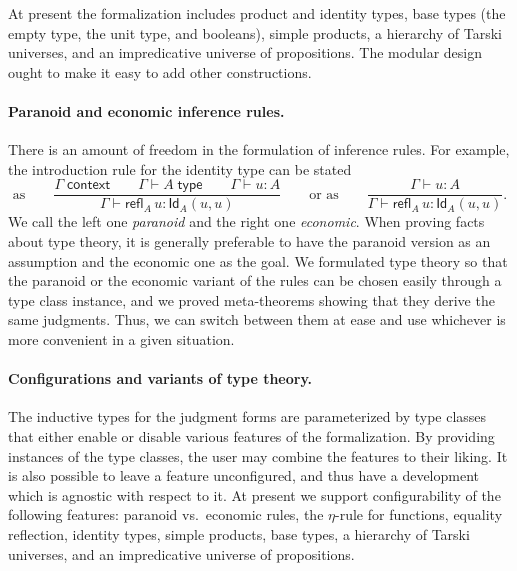 \documentclass{easychair}
\newcommand{\Id}[3]{\mathsf{Id}_{#1}(#2,#3)}
\newcommand{\refl}[2]{\mathsf{refl}_{#1}\,#2}
\newcommand{\ctx}{\Gamma}
\newcommand{\isctx}{\ctx\;\mathsf{context}}
\newcommand{\istype}[1]{\ctx \vdash #1 \;\mathsf{type}}
\newcommand{\isterm}[2]{\ctx \vdash #1 : #2}
\begin{document}
At present the formalization includes product and identity types, base types (the empty
type, the unit type, and booleans), simple products, a hierarchy of Tarski universes, and
an impredicative universe of propositions. The modular design ought to make it easy to add
other constructions.


\paragraph*{Paranoid and economic inference rules.}


There is an amount of freedom in the formulation of inference rules. For example, the
introduction rule for the identity type can be stated
%
\begin{equation*}
  \text{as}\qquad
  \frac{\isctx \qquad
  \istype{A} \qquad
  \isterm{u}{A}
  }{\isterm{\refl{A}{u}}{\Id{A}{u}{u}}}
  \qquad\text{or as}\qquad
  \frac{\isterm{u}{A}
  }{\isterm{\refl{A}{u}}{\Id{A}{u}{u}}}.
\end{equation*}
%
We call the left one \emph{paranoid} and the right one \emph{economic}. When proving facts about type theory, it is generally
preferable to have the paranoid version as an assumption and the economic one as the goal.
We formulated type theory so that the paranoid or the economic variant of the rules can be
chosen easily through a type class instance, and we proved meta-theorems showing that they
derive the same judgments. Thus, we can switch between them at ease and use whichever is
more convenient in a given situation.

\paragraph*{Configurations and variants of type theory.}
\label{sec:config-variant}


The inductive types for the judgment forms are parameterized by type classes that either
enable or disable various features of the formalization. By providing instances of the
type classes, the user may combine the features to their liking. It is also possible to
leave a feature unconfigured, and thus have a development which is agnostic with respect
to it. At present we support configurability of the following features: paranoid
vs.~economic rules, the $\eta$-rule for functions, equality reflection, identity types,
simple products, base types, a hierarchy of Tarski universes, and an impredicative
universe of propositions.
\end{document}
